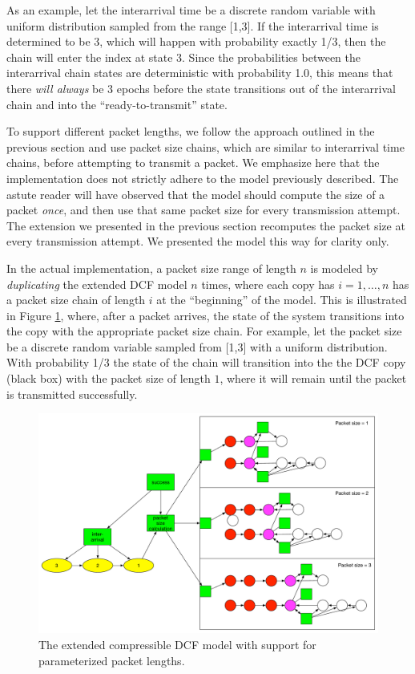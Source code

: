 \documentclass[conference]{IEEEtran}
\begin{document}
As an example, let the interarrival time be a discrete random variable with uniform distribution sampled from the range [1,3]. If the interarrival time is determined to be 3, which will happen with probability exactly 1/3, then the chain will enter the index at state 3. Since the probabilities between the interarrival chain states are deterministic with probability 1.0, this means that there \emph{will always} be 3 epochs before the state transitions out of the interarrival chain and into the ``ready-to-transmit'' state. 

To support different packet lengths, we follow the approach outlined in the previous section and use packet size chains, which are similar to interarrival time chains, before attempting to transmit a packet. We emphasize here that the implementation does not strictly adhere to the model previously described. The astute reader will have observed that the model should compute the size of a packet \emph{once}, and then use that same packet size for every transmission attempt. The extension we presented in the previous section recomputes the packet size at every transmission attempt. We presented the model this way for clarity only. 

In the actual implementation, a packet size range of length $n$ is modeled by \emph{duplicating} the extended DCF model $n$ times, where each copy has $i = 1,\dots,n$ has a packet size chain of length $i$ at the ``beginning'' of the model. This is illustrated in Figure \ref{fig:compressible_dcf_all}, where, after a packet arrives, the state of the system transitions into the copy with the appropriate packet size chain. For example, let the packet size be a discrete random variable sampled from [1,3] with a uniform distribution. With probability 1/3 the state of the chain will transition into the the DCF copy (black box) with the packet size of length $1$, where it will remain until the packet is transmitted successfully. 

\begin{figure}
\begin{center}
\includegraphics[scale=0.25]{../../sketches/compressible_dcf_all.pdf}
\caption{The extended compressible DCF model with support for parameterized packet lengths.}
\label{fig:compressible_dcf_all}
\end{center}
\end{figure}
\end{document}
